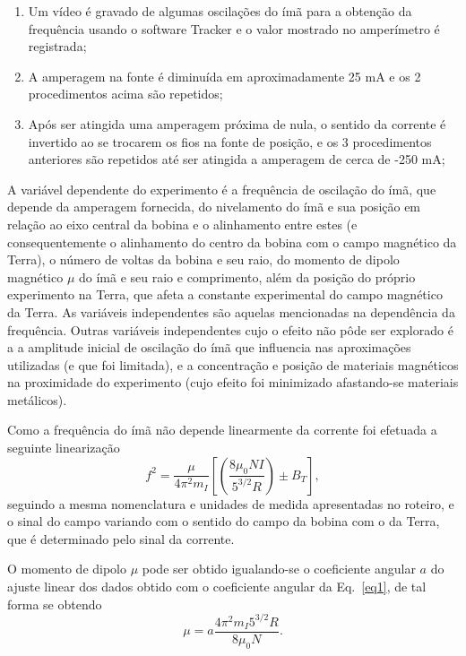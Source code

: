 \begin{enumerate}
    \item Um vídeo é gravado de algumas oscilações do ímã para a obtenção da frequência usando o software Tracker e o valor mostrado no amperímetro é registrada;
    \item A amperagem na fonte é diminuída em aproximadamente 25 mA e os 2 procedimentos acima são repetidos;
    \item Após ser atingida uma amperagem próxima de nula, o sentido da corrente é invertido ao se trocarem os fios na fonte de posição, e os 3 procedimentos anteriores são repetidos até ser atingida a amperagem de cerca de -250 mA;
\end{enumerate}

A variável dependente do experimento é a frequência de oscilação do ímã, que depende da amperagem fornecida, do nivelamento do ímã e sua posição em relação ao eixo central da bobina e o alinhamento entre estes (e consequentemente o alinhamento do centro da bobina com o campo magnético da Terra), o número de voltas da bobina e seu raio, do momento de dipolo magnético $\mu$ do ímã e seu raio e comprimento, além da posição do próprio experimento na Terra, que afeta a constante experimental do campo magnético da Terra. As variáveis independentes são aquelas mencionadas na dependência da frequência. Outras variáveis independentes cujo o efeito não pôde ser explorado é a a amplitude inicial de oscilação do ímã que influencia nas aproximações utilizadas (e que foi limitada), e a concentração e posição de materiais magnéticos na proximidade do experimento (cujo efeito foi minimizado afastando-se materiais metálicos).

Como a frequência do ímã não depende linearmente da corrente foi efetuada a seguinte linearização
\begin{equation}
    f^{2}=\frac{\mu}{4 \pi^{2} m_{I}}\left[\left(\frac{8 \mu_{0} N I}{5^{3 / 2} R}\right) \pm B_{T}\right],
    \label{eq1}
\end{equation}
seguindo a mesma nomenclatura e unidades de medida apresentadas no roteiro, e o sinal do campo variando com o sentido do campo da bobina com o da Terra, que é determinado pelo sinal da corrente.

O momento de dipolo $\mu$ pode ser obtido igualando-se o coeficiente angular $a$ do ajuste linear dos dados obtido com o coeficiente angular da Eq.~\ref{eq1}, de tal forma se obtendo
\begin{equation}
    \mu=a\frac{4 \pi^{2} m_{I}5^{3 / 2} R}{8 \mu_{0} N}.
    \label{eq2}
\end{equation}

